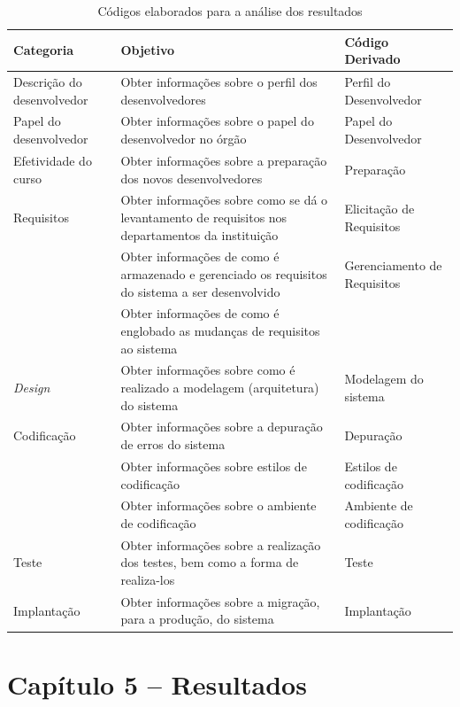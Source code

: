 \begin{table}[h]
	\centering
	\begin{tabular}{|m{4.8cm} | m{4.8cm} | m{4.8cm}|}
		\hline
		\textbf{Categoria} & \textbf{Objetivo} & 
		\textbf{Código Derivado} \\ \hline
		Descrição do desenvolvedor & Obter informações sobre o perfil dos desenvolvedores & 
		Perfil do Desenvolvedor \\ \hline
		Papel do desenvolvedor & Obter informações sobre o papel do desenvolvedor no órgão & 
		Papel do Desenvolvedor \\ \hline 
		Efetividade do curso & Obter informações sobre a preparação dos novos desenvolvedores & 
		Preparação \\ \hline 
		Requisitos & Obter informações sobre como se dá o levantamento de requisitos nos departamentos da instituição & Elicitação de Requisitos \\ \cline{2-3}
		& Obter informações de como é armazenado e gerenciado os requisitos do sistema a ser desenvolvido &
		Gerenciamento de Requisitos \\ \cline{2-2}
		& Obter informações de como é englobado as mudanças de requisitos ao sistema & \\ \hline
		\textit{Design} & Obter informações sobre como é realizado a modelagem (arquitetura) do sistema &
		Modelagem do sistema \\ \hline
		Codificação & Obter informações sobre a depuração de erros do sistema & Depuração \\ \cline{2-3}
		& Obter informações sobre estilos de codificação & Estilos de codificação \\ \cline{2-3}
		& Obter informações sobre o ambiente de codificação & Ambiente de codificação \\ \hline
		Teste & Obter informações sobre a realização dos testes, bem como a forma de realiza-los &
		Teste \\ \hline
		Implantação & Obter informações sobre a migração, para a produção, do sistema & Implantação \\
		\hline
	\end{tabular}
	
	\caption{Códigos elaborados para a análise dos resultados}
	\label{tab01}
\end{table}

\chapter[Capítulo 5]{Capítulo 5 – Resultados}

